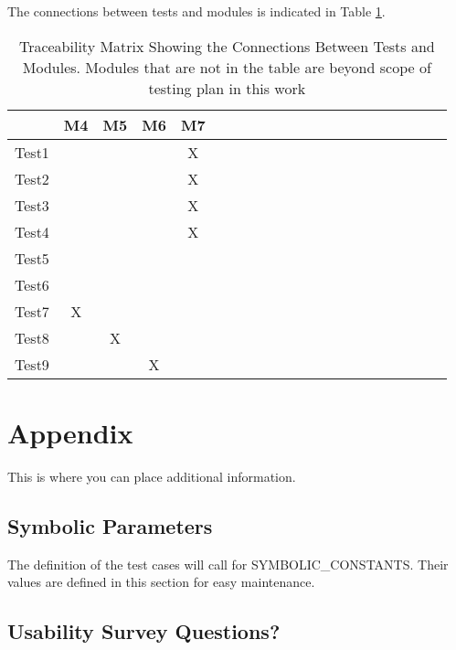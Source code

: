 \documentclass[12pt, titlepage]{article}
\begin{document}
The connections between tests and modules is indicated in Table \ref{Table:B_trace}.
\begin{table}
	\centering
	\begin{tabular}{|c|c|c|c|c|c|c|c|c|c|c|c|c|c|c|c|c|c|c|c|c|}
		\hline        
		             & M4 & M5 & M6 & M7  \\
		\hline
		Test1        && & & X \\ \hline
		Test2        & & & &X \\ \hline
		Test3        & & & &X  \\ \hline
		Test4        & & & &X\\ \hline
		Test5        & & & &   \\ \hline
		Test6        & & & &  \\ \hline
		Test7        &X& & &   \\ \hline
		Test8        & &X& &   \\ \hline
		Test9        & & &X&  \\ \hline
	\end{tabular}
	\caption{Traceability Matrix Showing the Connections Between Tests and Modules. Modules that are not in the table are beyond scope of testing plan in this work}
	\label{Table:B_trace}
\end{table}

\newpage





\newpage

\section{Appendix}

This is where you can place additional information.

\subsection{Symbolic Parameters}

The definition of the test cases will call for SYMBOLIC\_CONSTANTS.
Their values are defined in this section for easy maintenance.

\subsection{Usability Survey Questions?} \label{usab}
\end{document}
